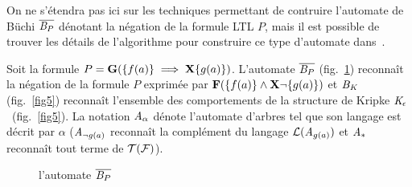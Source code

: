On ne s'étendra pas ici sur les techniques permettant de contruire l'automate de Büchi $\overline{\mathit B_P}$ dénotant
la négation de la formule LTL $P$, mais il est possible de trouver les détails de l'algorithme pour construire ce type
d'automate dans~\cite{DBLP:conf/pstv/GerthPVW95}.
\begin{example}
  Soit la formule $P = \mathbf G(\{f(a)\} \; \Longrightarrow \; \mathbf X \{g(a)\})$.
  L'automate $\overline{\mathit B_P}$ (fig.~\ref{fig4}) reconnaît la négation de la formule $P$
  exprimée par $\mathbf F(\{f(a)\} \land \mathbf X \neg\{g(a)\})$ et $\mathit B_\mathit K$ (fig.~\ref{fig5}) 
  reconnaît l'ensemble des comportements de la  structure de Kripke
  $\mathit K_\epsilon$~(fig.~\ref{fig5}). La notation $\mathit A_\alpha$ dénote l'automate d'arbres tel que son langage est décrit par $\alpha$
  ($\mathit A_{\neg g(a)}$ reconnaît la complément du langage $\mathcal{L}{}(\mathit A_{g(a)})$ et $\mathit A_*$ reconnaît tout terme de $\mathcal{T(F)}$).
  \begin{figure}[ht!]
    \centering
    \caption{\footnotesize l'automate $\overline{\mathit B_P}$}
    \label{fig4}  
  \end{figure}
\end{example}


